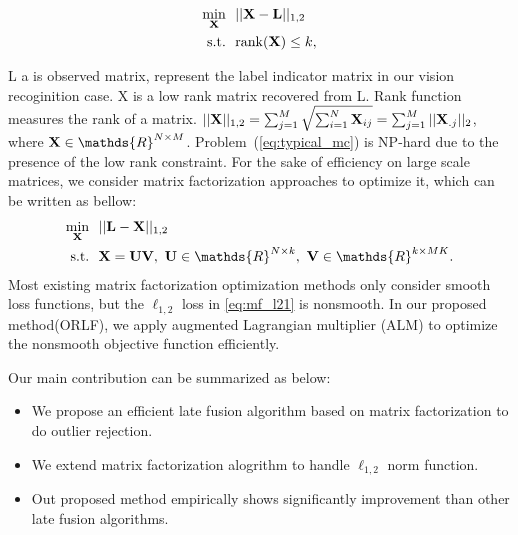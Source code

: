 \documentclass[letterpaper]{article}
\def\bL{{\bf L}}
\def\bU{{\bf U}}
\def\bV{{\bf V}}
\def\dsR{\mathds{R}}
\def\bX{{\bf X}}
\def\bX{{\bf X}}
\def\st{{\text{s.t.}}}
\def\rank{{\text{rank}}}
\begin{document}
\begin{align}\label{eq:typical_mc}
  \min_{\bX} ~&~ || \bX - \bL ||_{1,2}   \nonumber \\
  \st        ~&~ \rank(\bX) \leq k  ,
\end{align}
\noindent

L a is observed matrix, represent the label indicator matrix in our vision recoginition case. X is a low rank matrix recovered from L. Rank function measures the rank of a matrix. $|| \bX ||_{1,2} = \sum_{j = 1}^{M} \sqrt{\sum_{i=1}^{N} \bX_{ij}} = \sum_{j=1}^{M} || \bX_{.j} ||_2$, where $\bX \in \dsR^{N \times M}$.
Problem~(\ref{eq:typical_mc}) is NP-hard due to the presence of the low rank constraint. For the sake of efficiency on large scale matrices, we consider matrix factorization approaches to optimize it, which can be written as bellow:
\begin{align}\label{eq:mf_l21}
  \min_{\bX} ~&~ || \bL - \bX ||_{1,2}    \nonumber \\
  \st        ~&~ \bX = \bU \bV,~\bU \in \dsR^{N \times k},~\bV \in \dsR^{k \times MK} .
\end{align}
\noindent
Most existing matrix factorization optimization methods only consider smooth loss functions, but the $\ell_{1,2}$ loss in \ref{eq:mf_l21} is nonsmooth. In our proposed method(ORLF), we apply augmented Lagrangian multiplier (ALM) to optimize the nonsmooth objective function efficiently.

Our main contribution can be summarized as below:
\begin{itemize}
  \item We propose an efficient late fusion algorithm based on matrix factorization to do outlier rejection.
  \item We extend matrix factorization alogrithm to handle $\ell_{1,2}$ norm function.
  \item Out proposed method empirically shows significantly improvement than other late fusion algorithms.
\end{itemize}

\end{document}
